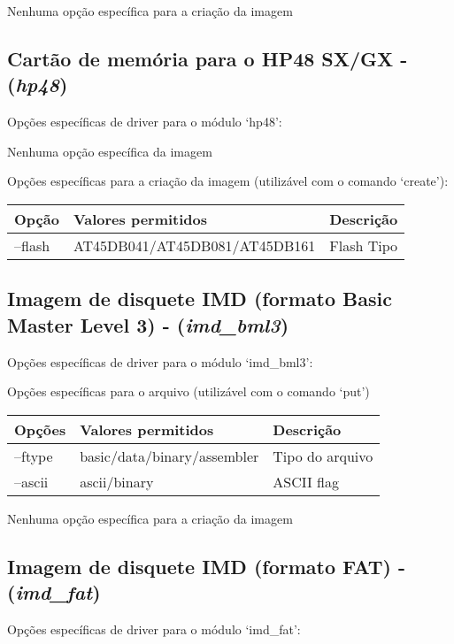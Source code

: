 \documentclass[letterpaper,10pt,brazil]{sphinxmanual}
\begin{document}
Nenhuma opção específica para a criação da imagem


\subsection{Cartão de memória para o HP48 SX/GX - (\emph{hp48})}
\label{tools/imgtool:cartao-de-memoria-para-o-hp48-sx-gx-hp48}
Opções específicas de driver para o módulo `hp48':

Nenhuma opção específica da imagem

Opções específicas para a criação da imagem (utilizável com o comando `create'):

\noindent\begin{tabulary}{\linewidth}{|L|L|L|}
\hline

Opção
&
Valores permitidos
&
Descrição
\\
\hline
--flash
&
AT45DB041/AT45DB081/AT45DB161
&
Flash Tipo
\\
\hline\end{tabulary}



\subsection{Imagem de disquete IMD (formato Basic Master Level 3) - (\emph{imd\_bml3})}
\label{tools/imgtool:imagem-de-disquete-imd-formato-basic-master-level-3-imd-bml3}
Opções específicas de driver para o módulo `imd\_bml3':

Opções específicas para o arquivo (utilizável com o comando `put')

\noindent\begin{tabulary}{\linewidth}{|L|L|L|}
\hline

Opções
&
Valores permitidos
&
Descrição
\\
\hline
--ftype
&
basic/data/binary/assembler
&
Tipo do arquivo
\\
\hline
--ascii
&
ascii/binary
&
ASCII flag
\\
\hline\end{tabulary}


Nenhuma opção específica para a criação da imagem


\subsection{Imagem de disquete IMD (formato FAT) - (\emph{imd\_fat})}
\label{tools/imgtool:imagem-de-disquete-imd-formato-fat-imd-fat}
Opções específicas de driver para o módulo `imd\_fat':
\end{document}
